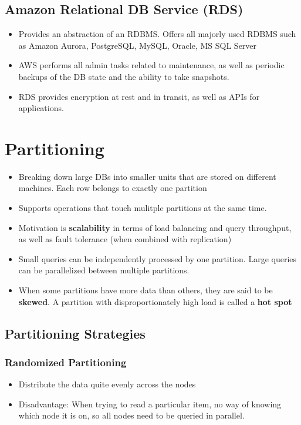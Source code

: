 \documentclass{article}
\begin{document}
\subsection{Amazon Relational DB Service (RDS)}
\begin{itemize}
    \item Provides an abstraction of an RDBMS. Offers all majorly used RDBMS such as Amazon Aurora, PostgreSQL, MySQL, Oracle, MS SQL Server
    
    \item AWS performs all admin tasks related to maintenance, as well as periodic backups of the DB state and the ability to take snapshots. 
    
    \item RDS provides encryption at rest and in transit, as well as APIs for applications. 
\end{itemize}

\section{Partitioning}
\begin{itemize}
    \item Breaking down large DBs into smaller units that are stored on different machines. Each row belongs to exactly one partition
    
    \item Supports operations that touch mulitple partitions at the same time. 
    
    \item Motivation is \textbf{scalability} in terms of load balancing and query throughput, as well as fault tolerance (when combined with replication)
    
    \item Small queries can be independently processed by one partition. Large queries can be parallelized between multiple partitions. 
    
    \item When some partitions have more data than others, they are said to be \textbf{skewed}. A partition with disproportionately high load is called a \textbf{hot spot}
\end{itemize}

\subsection{Partitioning Strategies}
\subsubsection{Randomized Partitioning}
\begin{itemize}
    \item Distribute the data quite evenly across the nodes
    
    \item Disadvantage: When trying to read a particular item, no way of knowing which node it is on, so all nodes need to be queried in parallel. 
\end{itemize}
\end{document}
